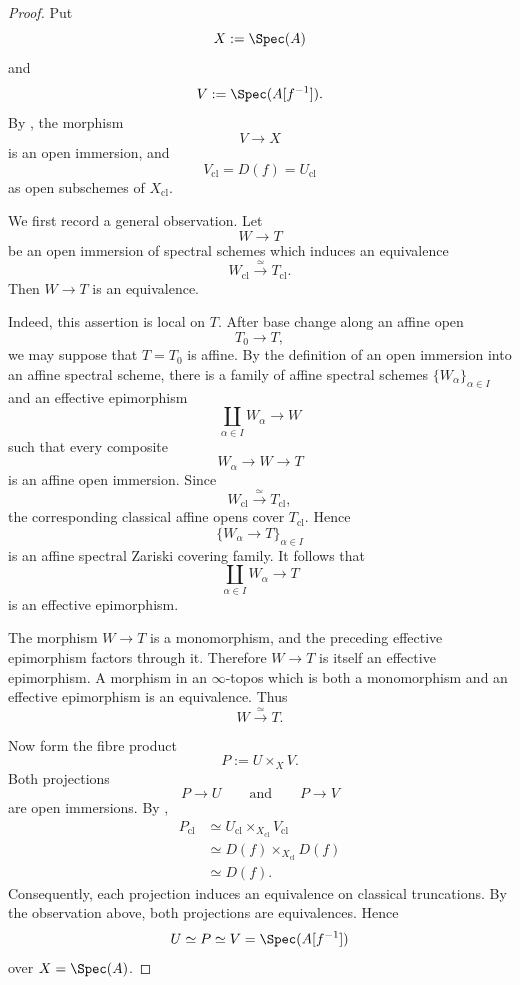 \begin{proof}
Put
\[
    X
    :=
    \Spec(A)
\]
and
\[
    V
    :=
    \Spec(A[f^{-1}]).
\]
By
,
the morphism
\[
    V
    \longrightarrow
    X
\]
is an open immersion, and
\[
    V_{\mathrm{cl}}
    =
    D(f)
    =
    U_{\mathrm{cl}}
\]
as open subschemes of \(X_{\mathrm{cl}}\).

We first record a general observation. Let
\[
    W
    \longrightarrow
    T
\]
be an open immersion of spectral schemes which induces an equivalence
\[
    W_{\mathrm{cl}}
    \xrightarrow{\simeq}
    T_{\mathrm{cl}}.
\]
Then \(W\to T\) is an equivalence.

Indeed, this assertion is local on \(T\). After base change along an
affine open
\[
    T_0
    \longrightarrow
    T,
\]
we may suppose that \(T=T_0\) is affine. By the definition of an open
immersion into an affine spectral scheme, there is a family of affine
spectral schemes \(\{W_\alpha\}_{\alpha\in I}\) and an effective
epimorphism
\[
    \coprod_{\alpha\in I}W_\alpha
    \longrightarrow
    W
\]
such that every composite
\[
    W_\alpha
    \longrightarrow
    W
    \longrightarrow
    T
\]
is an affine open immersion. Since
\[
    W_{\mathrm{cl}}
    \xrightarrow{\simeq}
    T_{\mathrm{cl}},
\]
the corresponding classical affine opens cover \(T_{\mathrm{cl}}\).
Hence
\[
    \{W_\alpha\to T\}_{\alpha\in I}
\]
is an affine spectral Zariski covering family. It follows that
\[
    \coprod_{\alpha\in I}W_\alpha
    \longrightarrow
    T
\]
is an effective epimorphism.

The morphism \(W\to T\) is a monomorphism, and the preceding effective
epimorphism factors through it. Therefore \(W\to T\) is itself an
effective epimorphism. A morphism in an \(\infty\)-topos which is both a
monomorphism and an effective epimorphism is an equivalence. Thus
\[
    W
    \xrightarrow{\simeq}
    T.
\]

Now form the fibre product
\[
    P
    :=
    U\times_XV.
\]
Both projections
\[
    P
    \longrightarrow
    U
    \qquad\text{and}\qquad
    P
    \longrightarrow
    V
\]
are open immersions. By
,
\[
\begin{aligned}
    P_{\mathrm{cl}}
    &\simeq
    U_{\mathrm{cl}}
    \times_{X_{\mathrm{cl}}}
    V_{\mathrm{cl}}
    \\
    &\simeq
    D(f)
    \times_{X_{\mathrm{cl}}}
    D(f)
    \\
    &\simeq
    D(f).
\end{aligned}
\]
Consequently, each projection induces an equivalence on classical
truncations. By the observation above, both projections are
equivalences. Hence
\[
    U
    \simeq
    P
    \simeq
    V
    =
    \Spec(A[f^{-1}])
\]
over \(X=\Spec(A)\).
\end{proof}

